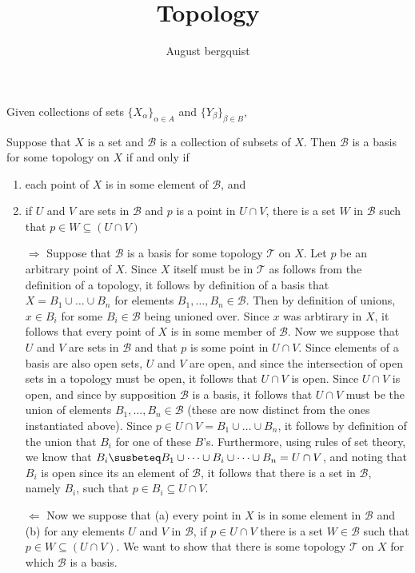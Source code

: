 \documentclass{article}
\title{Topology}
\author{August bergquist}
\newcommand{\topT}{\mathcal{T}}
\begin{document}
 Given collections of sets $\{X_\alpha\}_{\alpha\in A}$ and $\{Y_{\beta}\}_{\beta\in B}$, 
$$ $$

 Suppose that $X$ is a set and $\mathcal{B}$ is a collection of subsets of $X$. Then $\mathcal{B}$ is a basis for some topology on $X$ if and only if
\begin{enumerate}
    \item each point of $X$ is in some element of $\mathcal{B}$, and
    \item if $U$ and $V$ are sets in $\mathcal{B}$ and $p$ is a point in $U\cap V$, there is a set $W$ in $\mathcal{B}$ such that $p\in W \subseteq (U\cap V)$
\end{enumerate}

\begin{itemize}
    \item[$\Rightarrow$] Suppose that $\mathcal{B}$ is a basis for some topology $\topT$ on $X$. Let $p$ be an arbitrary point of $X$. Since $X$ itself must be in $\topT$ as follows from the definition of a topology, it follows by definition of a basis that $X = B_1\cup \dots\cup B_n$ for elements $B_1,\dots,B_n\in \mathcal{B}$. Then by definition of unions, $x\in B_i$ for some $B_i\in \mathcal{B}$ being unioned over. Since $x$ was arbtirary in $X$, it follows that every point of $X$ is in some member of $\mathcal{B}$. Now we suppose that $U$ and $V$ are sets in $\mathcal{B}$ and that $p$ is some point in $U\cap V$. Since elements of a basis are also open sets, $U$ and $V$ are open, and since the intersection of open sets in a topology must be open, it follows that $U\cap V$ is open. Since $U\cap V$ is open, and since by supposition $\mathcal{B}$ is a basis, it follows that $U\cap V$ must be the union of elements $B_1,\dots,B_n\in \mathcal{B}$ (these are now distinct from the ones instantiated above). Since $p\in U\cap V = B_1\cup \dots \cup B_n$, it follows by definition of the union that $B_i$ for one of these $B$'s. Furthermore, using rules of set theory, we know that $B_i \susbeteq B_1\cup \dots \cup B_i \cup \dots\cup B_n = U\cap V$, and noting that $B_i$ is open since its an element of $\mathcal{B}$, it follows that there is a set in $\mathcal{B}$, namely $B_i$, such that $p\in B_i\subseteq U\cap V$.
    \item[$\Leftarrow$] Now we suppose that (a) every point in $X$ is in some element in $\mathcal{B}$ and (b) for any elements $U$ and $V$ in $\mathcal{B}$, if $p\in U\cap V$ there is a set $W\in \mathcal{B}$ such that $p\in W\subseteq (U\cap V)$. We want to show that there is some topology $\mathcal{T}$ on $X$ for which $\mathcal{B}$ is a basis.\\


\end{itemize}
\end{document}
